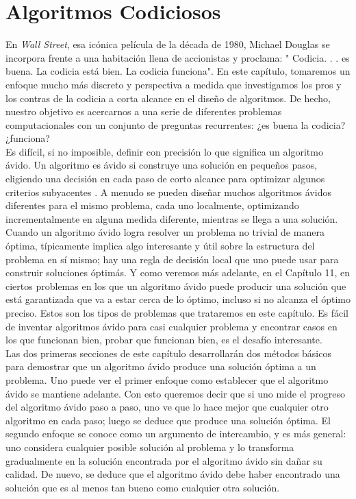 \documentclass[a4paper, 12pt]{book}
\begin{document}
\newpage

\chapter{Algoritmos Codiciosos}

En \textit{Wall Street}, esa icónica película de la década de 1980, Michael Douglas se incorpora frente a una habitación llena de accionistas y proclama: " Codicia. . . es buena. La codicia está bien. La codicia funciona". En este capítulo, tomaremos un enfoque mucho más discreto y perspectiva a medida que investigamos los pros y los contras de la codicia a corta alcance en el diseño de algoritmos. De hecho, nuestro objetivo es acercarnos a una serie de diferentes problemas computacionales con un conjunto de preguntas recurrentes: ¿es buena la codicia? ¿funciona?\\

Es difícil, si no imposible, definir con precisión lo que significa un algoritmo ávido. Un algoritmo es ávido si construye una solución en pequeños pasos, eligiendo una decisión en cada paso de corto alcance para optimizar algunos criterios subyacentes . A menudo se pueden diseñar muchos algoritmos ávidos diferentes para el mismo problema, cada uno localmente, optimizando incrementalmente en alguna medida diferente, mientras se llega a una solución.\\

Cuando un algoritmo ávido logra resolver un problema no trivial de manera óptima, típicamente implica algo interesante y útil sobre la estructura del problema en sí mismo; hay una regla de decisión local que uno puede usar para construir soluciones óptimás. Y como veremos más adelante, en el Capítulo 11, en ciertos problemas en los que un algoritmo ávido puede producir una solución que está garantizada que va a estar cerca de lo óptimo, incluso si no alcanza el óptimo preciso. Estos son los tipos de problemas que trataremos en este capítulo. Es fácil de inventar algoritmos ávido para casi cualquier problema y encontrar casos en los que funcionan bien, probar que funcionan bien, es el desafío interesante.\\

Las dos primeras secciones de este capítulo desarrollarán dos métodos básicos para demostrar que un algoritmo ávido produce una solución óptima a un problema. Uno puede ver el primer enfoque como establecer que el algoritmo ávido se mantiene adelante. Con esto queremos decir que si uno mide el progreso del algoritmo ávido paso a paso, uno ve que lo hace mejor que cualquier otro algoritmo en cada paso; luego se deduce que produce una solución óptima. El segundo enfoque se conoce como un argumento de intercambio, y es más general: uno considera cualquier posible solución al problema y lo transforma gradualmente en la solución encontrada por el algoritmo ávido sin dañar su calidad. De nuevo, se deduce que el algoritmo ávido debe haber encontrado una solución que es al menos tan bueno como cualquier otra solución.\\
\end{document}

